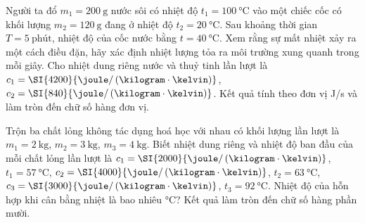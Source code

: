 \begin{ex}
Người ta đổ $m_1 =\SI{200}{\gram}$ nước sôi có nhiệt độ $t_1 =\SI{100}{\celsius}$ vào một chiếc cốc có khối lượng $m_2 = \SI{120}{\gram}$ đang ở nhiệt độ $t_2 =\SI{20}{\celsius}$. Sau khoảng thời gian $T = \SI{5}{\text{phút}}$, nhiệt độ của cốc nước bằng $t=\SI{40}{\celsius}$. Xem rằng sự mất nhiệt xảy ra một cách điều đặn, hãy xác định nhiệt lượng tỏa ra môi trường xung quanh trong mỗi giây. Cho nhiệt dung riêng nước và thuỷ tinh lần lượt là $c_1=\SI{4200}{\joule/\left(\kilogram\cdot\kelvin\right)}$, $c_2=\SI{840}{\joule/\left(\kilogram\cdot\kelvin\right)}$. Kết quả tính theo đơn vị \si{\joule/\second} và làm tròn đến chữ số hàng đơn vị.
	
\end{ex}
\begin{ex}
	Trộn ba chất lỏng không tác dụng hoá học với nhau có khối lượng lần lượt là $m_1=\SI{2}{\kilogram}$, $m_2=\SI{3}{\kilogram}$, $m_3=\SI{4}{\kilogram}$. Biết nhiệt dung riêng và nhiệt độ ban đầu của mỗi chất lỏng lần lượt là $c_1=\SI{2000}{\joule/\left(\kilogram\cdot\kelvin\right)}$, $t_1=\SI{57}{\celsius}$, $c_2=\SI{4000}{\joule/\left(\kilogram\cdot\kelvin\right)}$, $t_2=\SI{63}{\celsius}$, $c_3=\SI{3000}{\joule/\left(\kilogram\cdot\kelvin\right)}$, $t_3=\SI{92}{\celsius}$. Nhiệt độ của hỗn hợp khi cân bằng nhiệt là bao nhiêu \si{\celsius}? Kết quả làm tròn đến chữ số hàng phần mười.
	
\end{ex}
